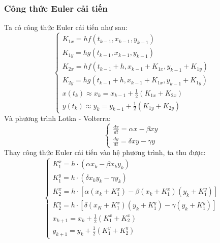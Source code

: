 \documentclass[a4paper,15pt]{article}
\begin{document}
\subsubsection{Công thức Euler cải tiến}
Ta có công thức Euler cải tiến như sau:
\[
\begin{cases}
K_{1x} = h f(t_{k-1}, x_{k-1}, y_{k-1}) \\
K_{1y} = h g(t_{k-1}, x_{k-1}, y_{k-1}) \\
K_{2x} = h f(t_{k-1} + h, x_{k-1} + K_{1x}, y_{k-1} + K_{1y}) \\
K_{2y} = h g(t_{k-1} + h, x_{k-1} + K_{1x}, y_{k-1} + K_{1y}) \\
x(t_k) \approx x_k = x_{k-1} + \frac{1}{2}(K_{1x} + K_{2x}) \\
y(t_k) \approx y_k = y_{k-1} + \frac{1}{2}(K_{1y} + K_{2y})
\end{cases}
\]
Và phương trình Lotka - Volterra:
\[
    \begin{cases}
    \frac{dx}{dt} = \alpha x - \beta x y \\
    \frac{dy}{dt} = \delta x y - \gamma y
    \end{cases}
\]
Thay công thức Euler cải tiến vào hệ phương trình, ta thu được:
\[
\begin{cases}
K_1^x = h \cdot \left( \alpha x_k - \beta x_k y_k \right) \\
K_1^y = h \cdot \left( \delta x_k y_k - \gamma y_k \right) \\
K_2^x = h \cdot \left[ \alpha (x_k + K_1^x) - \beta (x_k + K_1^x)(y_k + K_1^y) \right] \\
K_2^y = h \cdot \left[ \delta (x_K + K_1^x)(y_k + K_1^y) - \gamma (y_k + K_1^y) \right] \\
x_{k+1} = x_k + \frac{1}{2} \left( K_1^x + K_2^x \right) \\
y_{k+1} = y_k + \frac{1}{2} \left( K_1^y + K_2^y \right)
\end{cases}
\]
\end{document}

